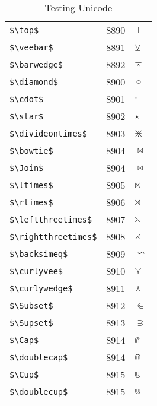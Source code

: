 \documentclass{article}
\begin{document}
\begin{table}
\begin{center}
\begin{tabular}{lll}
\verb#$\top$# & 8890 & $\top$\\ 
\verb#$\veebar$# & 8891 & $\veebar$\\ 
\verb#$\barwedge$# & 8892 & $\barwedge$\\ 
\verb#$\diamond$# & 8900 & $\diamond$\\ 
\verb#$\cdot$# & 8901 & $\cdot$\\ 
\verb#$\star$# & 8902 & $\star$\\ 
\verb#$\divideontimes$# & 8903 & $\divideontimes$\\ 
\verb#$\bowtie$# & 8904 & $\bowtie$\\ 
\verb#$\Join$# & 8904 & $\Join$\\ 
\verb#$\ltimes$# & 8905 & $\ltimes$\\ 
\verb#$\rtimes$# & 8906 & $\rtimes$\\ 
\verb#$\leftthreetimes$# & 8907 & $\leftthreetimes$\\ 
\verb#$\rightthreetimes$# & 8908 & $\rightthreetimes$\\ 
\verb#$\backsimeq$# & 8909 & $\backsimeq$\\ 
\verb#$\curlyvee$# & 8910 & $\curlyvee$\\ 
\verb#$\curlywedge$# & 8911 & $\curlywedge$\\ 
\verb#$\Subset$# & 8912 & $\Subset$\\ 
\verb#$\Supset$# & 8913 & $\Supset$\\ 
\verb#$\Cap$# & 8914 & $\Cap$\\ 
\verb#$\doublecap$# & 8914 & $\doublecap$\\ 
\verb#$\Cup$# & 8915 & $\Cup$\\ 
\verb#$\doublecup$# & 8915 & $\doublecup$\\ 
\end{tabular}
\end{center}
\caption{Testing Unicode}
\end{table}
\clearpage
\end{document}

